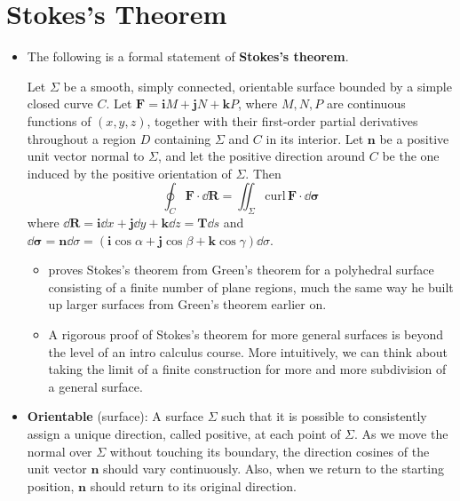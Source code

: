 \documentclass[../main.tex]{subfiles}
\begin{document}
\section{Stokes's Theorem}
\begin{itemize}
    \item The following is a formal statement of \textbf{Stokes's theorem}.
    \begin{thm}
        Let $\Sigma$ be a smooth, simply connected, orientable surface bounded by a simple closed curve $C$. Let $\mathbf{F}=\mathbf{i}M+\mathbf{j}N+\mathbf{k}P$, where $M,N,P$ are continuous functions of $(x,y,z)$, together with their first-order partial derivatives throughout a region $D$ containing $\Sigma$ and $C$ in its interior. Let $\mathbf{n}$ be a positive unit vector normal to $\Sigma$, and let the positive direction around $C$ be the one induced by the positive orientation of $\Sigma$. Then
        \begin{equation*}
            \oint_C\mathbf{F}\cdot\dd{\mathbf{R}} = \iint_\Sigma\text{curl}\,\mathbf{F}\cdot\dd{\bm{\sigma}}
        \end{equation*}
        where $\dd{\mathbf{R}}=\mathbf{i}\dd{x}+\mathbf{j}\dd{y}+\mathbf{k}\dd{z}=\mathbf{T}\dd{s}$ and $\dd{\bm{\sigma}}=\mathbf{n}\dd{\sigma}=(\mathbf{i}\cos\alpha+\mathbf{j}\cos\beta+\mathbf{k}\cos\gamma)\dd{\sigma}$.
    \end{thm}
    \begin{itemize}
        \item \textcite{bib:Thomas} proves Stokes's theorem from Green's theorem for a polyhedral surface consisting of a finite number of plane regions, much the same way he built up larger surfaces from Green's theorem earlier on.
        \item A rigorous proof of Stokes's theorem for more general surfaces is beyond the level of an intro calculus course. More intuitively, we can think about taking the limit of a finite construction for more and more subdivision of a general surface.
    \end{itemize}
    \item \textbf{Orientable} (surface): A surface $\Sigma$ such that it is possible to consistently assign a unique direction, called positive, at each point of $\Sigma$. As we move the normal over $\Sigma$ without touching its boundary, the direction cosines of the unit vector $\mathbf{n}$ should vary continuously. Also, when we return to the starting position, $\mathbf{n}$ should return to its original direction.

\end{itemize}
\end{document}
